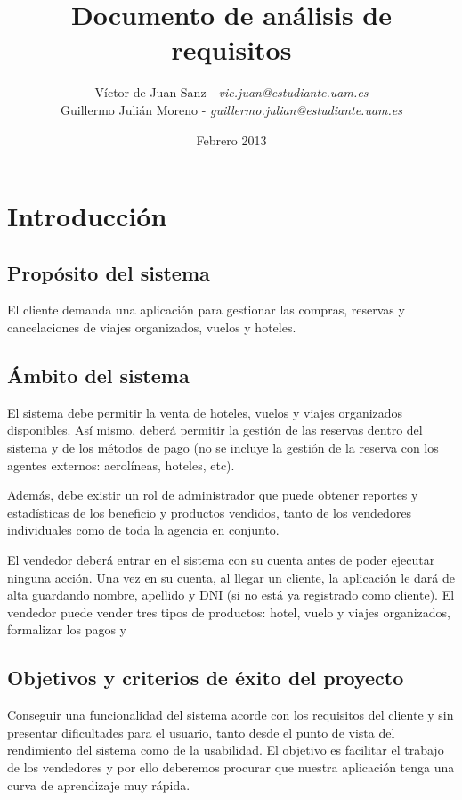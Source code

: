 \documentclass[12pt,a4paper,titlepage]{article}
\author{Víctor de Juan Sanz - \emph{vic.juan@estudiante.uam.es}  \\ Guillermo Julián Moreno - \emph{guillermo.julian@estudiante.uam.es}}
\date{Febrero 2013}
\title{Documento de análisis de requisitos}
\begin{document}
\pagestyle{plain}
\maketitle
\newpage

\tableofcontents
\newpage
\section{Introducción}
\subsection{Propósito del sistema}

El cliente demanda una aplicación para gestionar las compras, reservas y cancelaciones de viajes organizados, vuelos y hoteles.
\subsection{Ámbito del sistema}

El sistema debe permitir la venta de hoteles, vuelos y viajes organizados disponibles. Así mismo, deberá permitir la gestión de las reservas dentro del sistema y de los métodos de pago (no se incluye la gestión de la reserva con los agentes externos: aerolíneas, hoteles, etc).

Además, debe existir un rol de administrador que puede obtener reportes y estadísticas de los beneficio y productos vendidos, tanto de los vendedores individuales como de toda la agencia en conjunto.

El vendedor deberá entrar en el sistema con su cuenta antes de poder ejecutar ninguna acción. Una vez en su cuenta, al llegar un cliente, la aplicación le dará de alta guardando nombre, apellido y DNI (si no está ya registrado como cliente). El vendedor puede vender tres tipos de productos: hotel, vuelo y viajes organizados, formalizar los pagos y 


\subsection{Objetivos y criterios de éxito del proyecto}

Conseguir una funcionalidad del sistema acorde con los requisitos del cliente y sin presentar dificultades para el usuario, tanto desde el punto de vista del rendimiento del sistema como de la usabilidad. El objetivo es facilitar el trabajo de los vendedores y por ello deberemos procurar que nuestra aplicación tenga una curva de aprendizaje muy rápida.
\end{document}
